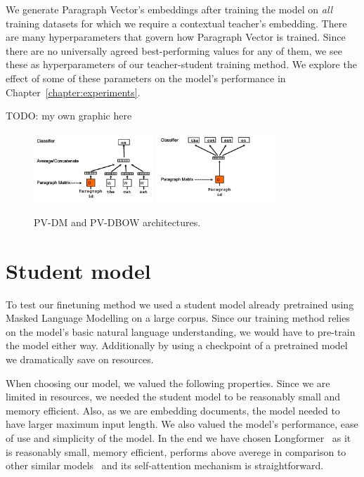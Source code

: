 We generate Paragraph Vector's embeddings after training the model on
\emph{all} training datasets for which we require a contextual teacher's
embedding. There are many hyperparameters that govern how Paragraph Vector is
trained. Since there are no universally agreed best-performing values for any
of them, we see these as hyperparameters of our teacher-student training
method. We explore the effect of some of these parameters on the model's
performance in Chapter~\ref{chapter:experiments}.

TODO: my own graphic here

\begin{figure}[h]
    \centering
    \includegraphics[width=0.4\textwidth]{./img/pv-dm.png}
    \includegraphics[width=0.4\textwidth]{./img/pv-dbow.png}
    \caption{PV-DM and PV-DBOW architectures.\label{fig:pv-dm_pv-dbow}}
\end{figure}

\section{Student model}\label{section:student_model}


To test our finetuning method we used a student model already pretrained using
Masked Language Modelling on a large corpus. Since our training method relies on
the model's basic natural language understanding, we would have to pre-train the
model either way. Additionally by using a checkpoint of a pretrained model we
dramatically save on resources.

When choosing our model, we valued the following properties. Since we are
limited in resources, we needed the student model to be reasonably small and
memory efficient. Also, as we are embedding documents, the model needed to have
larger maximum input length. We also valued the model's performance, ease of use
and simplicity of the model. In the end we have chosen
Longformer~\citep{beltagy2020longformer} as it is reasonably small, memory
efficient, performs above averege in comparison to other similar
models~\citep{tay2020long} and its self-attention mechanism is straightforward.

